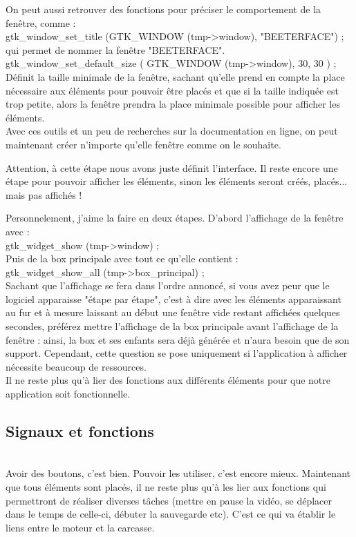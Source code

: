 \documentclass[11pt,french,a4paper]{report}
\begin{document}
On peut aussi retrouver des fonctions pour préciser le comportement de la fenêtre, comme : \\
 
gtk\_window\_set\_title (GTK\_WINDOW (tmp->window), "BEETERFACE") ; \\
qui permet de nommer la fenêtre "BEETERFACE". \\

gtk\_window\_set\_default\_size ( GTK\_WINDOW (tmp->window), 30, 30 ) ; \\
Définit la taille minimale de la fenêtre, sachant qu'elle prend en compte la place nécessaire aux éléments pour pouvoir 
être placés et que si la taille indiquée est trop petite, alors la fenêtre prendra la place minimale possible 
pour afficher les éléments. \\

Avec ces outils et un peu de recherches sur la documentation en ligne, on peut maintenant créer n'importe qu'elle fenêtre 
comme on le souhaite. 

Attention, à cette étape nous avons juste définit l'interface. Il reste encore une étape pour pouvoir afficher les éléments, sinon
les éléments seront créés, placés... mais pas affichés ! 

Personnelement, j'aime la faire en deux étapes. D'abord l'affichage de la fenêtre avec : \\
gtk\_widget\_show (tmp->window) ; \\

Puis de la box principale avec tout ce qu'elle contient : \\
gtk\_widget\_show\_all (tmp->box\_principal) ; \\

Sachant que l'affichage se fera dans l'ordre annoncé, si vous avez peur que le logiciel apparaisse "étape par étape", c'est à 
dire avec les éléments apparaissant au fur et à mesure laissant au début une fenêtre vide restant affichées quelques secondes, 
préférez mettre l'affichage de la box principale avant l'affichage de la fenêtre : ainsi, la box et ses enfants sera déjà générée 
et n'aura besoin que de son support. Cependant, cette question se pose uniquement si l'application à afficher nécessite beaucoup de 
ressources. \\

Il ne reste plus qu'à lier des fonctions aux différents éléments pour que notre application soit 
fonctionnelle.\\
        
        \subsection{Signaux et fonctions} \\
Avoir des boutons, c'est bien. Pouvoir les utiliser, c'est encore mieux. Maintenant que tous éléments sont placés, 
il ne reste plus qu'à les lier aux fonctions qui permettront de réaliser diverses tâches (mettre en pause la vidéo,
se déplacer dans le temps de celle-ci, débuter la sauvegarde etc).    
C'est ce qui va établir le liens entre le moteur et la carcasse. \\
\end{document}
